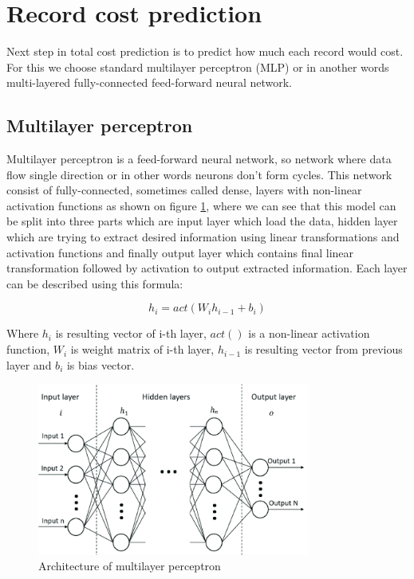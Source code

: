 
\section{Record cost prediction}

Next step in total cost prediction is to predict how much each record would cost. For this we choose standard multilayer perceptron (MLP) or in another words multi-layered fully-connected feed-forward neural network. 

\subsection{Multilayer perceptron}
\label{MLP}

Multilayer perceptron is a feed-forward neural network, so network where data flow single direction or in other words neurons don't form cycles. This network consist of fully-connected, sometimes called dense, layers with non-linear activation functions as shown on figure \ref{fig:mlp}, where we can see that this model can be split into three parts which are input layer which load the data, hidden layer which are trying to extract desired information using linear transformations and activation functions and finally output layer which contains final linear transformation followed by activation to output extracted information. Each layer can be described using this formula:

\begin{equation}
	\label{eqn:mlp}
	h_i = act(W_i h_{i-1} + b_i)
\end{equation}

Where $h_i$ is resulting vector of i-th layer, $act()$ is a non-linear activation function, $W_i$ is weight matrix of i-th layer, $h_{i-1}$ is resulting vector from previous layer and $b_i$ is bias vector.

\begin{figure}[!h]
	\centering
	
	\includegraphics[width=0.8\textwidth]{images/MLP_arch.png}
	
	\caption{Architecture of multilayer perceptron \cite{MLParch}}
	\label{fig:mlp}
\end{figure} 